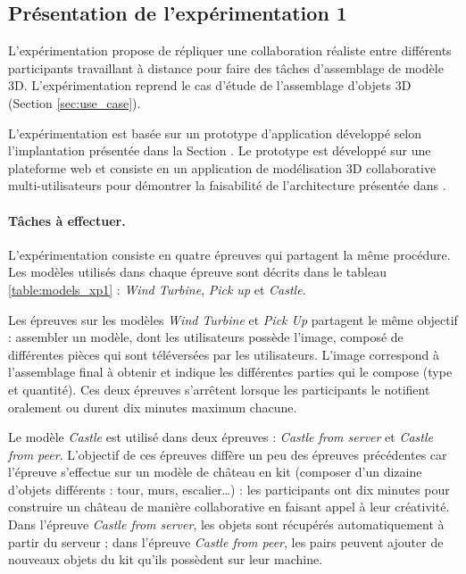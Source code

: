 
\subsection{Présentation de l'expérimentation 1}

L'expérimentation propose de répliquer une collaboration réaliste entre 
différents participants travaillant à distance pour faire des tâches d'assemblage de 
modèle 3D. L'expérimentation reprend le cas d'étude de l'assemblage d'objets 3D 
(Section \ref{sec:use_case}). 

L'expérimentation est basée sur un prototype d'application développé selon 
l'implantation présentée dans la Section .
Le prototype est développé sur une plateforme web et consiste en un application 
de modélisation 3D collaborative multi-utilisateurs pour démontrer la faisabilité de 
l'architecture présentée dans . 


\paragraph{Tâches à effectuer.}
L'expérimentation consiste en quatre épreuves qui partagent la même procédure.
Les modèles utilisés dans chaque épreuve sont décrits dans le tableau 
\ref{table:models_xp1} : \textit{Wind Turbine}, \textit{Pick up} et \textit{Castle}. 

Les épreuves sur les modèles \textit{Wind Turbine} et \textit{Pick Up} partagent le 
même objectif : 
assembler un modèle, dont les utilisateurs possède l'image, composé de 
différentes pièces qui sont téléversées par les utilisateurs. L'image correspond à 
l'assemblage final à obtenir et indique les différentes parties qui le 
compose (type et quantité). Ces deux épreuves s'arrêtent lorsque les participants 
le notifient oralement ou durent dix minutes maximum chacune.

Le modèle \textit{Castle} est utilisé dans deux épreuves : 
\textit{Castle from server} et \textit{Castle from peer}. L'objectif de ces épreuves
diffère un peu des épreuves précédentes car l'épreuve s'effectue sur un  modèle 
de château en kit (composer d'un dizaine d'objets différents : tour, murs, 
escalier\dots) : les 
participants ont dix minutes pour construire un 
château de manière collaborative en faisant appel à leur créativité. 
Dans l'épreuve \textit{Castle from server}, les objets sont récupérés 
automatiquement à partir du serveur ; 
dans l'épreuve \textit{Castle from peer}, les pairs peuvent ajouter de nouveaux 
objets du kit qu'ils possèdent sur leur machine.

